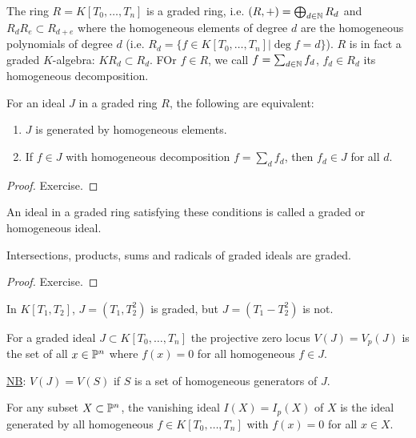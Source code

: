 \documentclass[a4paper,11pt]{article}
\begin{document}
			The ring $R=K[T_0,\dots,T_n]$ is a graded ring, i.e. $(R,+)=\bigoplus_{d\in\N}R_d$ and $R_dR_e\subset R_{d+e}$ where the homogeneous elements of degree $d$ are the homogeneous polynomials of degree $d$ (i.e. $R_d=\{f\in K[T_0,\dots,T_n]|\deg f=d\}$). $R$ is in fact a graded $K$-algebra: $KR_d\subset R_d$. FOr $f\in R$, we call $f=\sum_{d\in\N}f_d$, $f_d\in R_d$ its homogeneous decomposition.

			\begin{prop}
				For an ideal $J$ in a graded ring $R$, the following are equivalent:
				\begin{enumerate}
					\item $J$ is generated by homogeneous elements.
					\item If $f\in J$ with homogeneous decomposition $f=\sum_df_d$, then $f_d\in J$ for all $d$.
				\end{enumerate}
			\end{prop}
			\begin{proof}\renewcommand{\qedsymbol}{}
				Exercise.
			\end{proof}\renewcommand{\qedsymbol}{$\square$}

			\noindent An ideal in a graded ring satisfying these conditions is called a graded or homogeneous ideal.

			\begin{prop}
				Intersections, products, sums and radicals of graded ideals are graded.
			\end{prop}
			\begin{proof}\renewcommand{\qedsymbol}{}
				Exercise.
			\end{proof}\renewcommand{\qedsymbol}{$\square$}

			\begin{eg}
				In $K[T_1,T_2]$, $J=(T_1,T_2^2)$ is graded, but $J=(T_1-T_2^2)$ is not.
			\end{eg}

			\begin{defi}
				For a graded ideal $J\subset K[T_0,\dots,T_n]$ the projective zero locus $V(J)=V_p(J)$ is the set of all $x\in\P^n$ where $f(x)=0$ for all homogeneous $f\in J$.
			\end{defi}

			\noindent\underline{NB}: $V(J)=V(S)$ if $S$ is a set of homogeneous generators of $J$.

			\begin{defi}
				For any subset $X\subset\P^n$, the vanishing ideal $I(X)=I_p(X)$ of $X$ is the ideal generated by all homogeneous $f\in K[T_0,\dots,T_n]$ with $f(x)=0$ for all $x\in X$.
			\end{defi}
\end{document}
